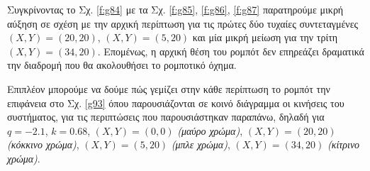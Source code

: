Συγκρίνοντας το Σχ. \ref{f:g84} με τα Σχ. \ref{f:g85}, \ref{f:g86}, \ref{f:g87} παρατηρούμε μικρή αύξηση σε σχέση με την αρχική περίπτωση για τις πρώτες δύο τυχαίες συντεταγμένες $(X,Y) = (20,20)$, $(X,Y) = (5,20)$ και μία μικρή μείωση για την τρίτη $(X,Y) = (34,20)$. Επομένως, η αρχική θέση του ρομπότ δεν επηρεάζει δραματικά την διαδρομή που θα ακολουθήσει το ρομποτικό όχημα.

Επιπλέον μπορούμε να δούμε πώς γεμίζει στην κάθε περίπτωση το ρομπότ την επιφάνεια στο Σχ. \ref{g93} όπου παρουσιάζονται σε κοινό διάγραμμα οι κινήσεις του συστήματος, για τις περιπτώσεις που παρουσιάστηκαν παραπάνω, δηλαδή για $q = -2.1$, $k = 0.68$, $(X,Y) = (0,0)$ \emph{(μαύρο χρώμα)}, $(X,Y) = (20,20)$ \emph{(κόκκινο χρώμα)}, $(X,Y) = (5,20)$ \emph{(μπλε χρώμα)}, $(X,Y) = (34,20)$ \emph{(κίτρινο χρώμα)}.


